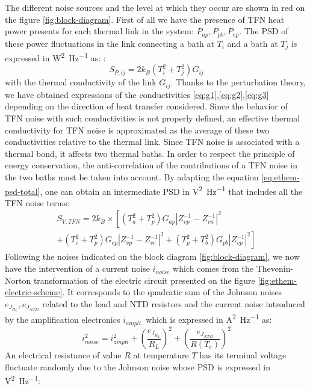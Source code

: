 The different noise sources and the level at which they occur are shown in red on the figure \ref{fig:block-diagram}. First of all we have the presence of TFN heat power presents for each thermal link in the system: $P_{ap}, P_{pb}, P_{ep}$. The PSD of these power fluctuations in the link connecting a bath at $T_i$ and a bath at $T_j$ is expressed in \si{\watt^2\per\Hz} as:
:
\begin{equation}
S_{P,ij} = 2k_B(T_i^2 + T_j^2) G_{ij}
\end{equation}
with the thermal conductivity of the link $G_{ij}$.
Thanks to the perturbation theory, we have obtained expressions of the conductivities \ref{eq:g1},\ref{eq:g2},\ref{eq:g3} depending on the direction of heat transfer considered. Since the behavior of TFN noise with such conductivities is not properly defined, an effective thermal conductivity for TFN noise is approximated as the average of these two conductivities relative to the thermal link. Since TFN noise is associated with a thermal bond, it affects two thermal baths. In order to respect the principle of energy conservation, the anti-correlation of the contributions of a TFN noise in the two baths must be taken into account. By adapting the equation \ref{eq:ethem-psd-total}, one can obtain an intermediate PSD in \si{\volt^2\per\Hz} that includes all the TFN noise terms:
\begin{multline}
S_{V,TFN} = 2k_B \times  \left[ (T_a^2 + T_p^2) G_{ap} \left\vert Z_{vp}^{-1} - Z_{va}^{-1} \right\vert^2 \right. \\ \left. + (T_e^2 + T_p^2) G_{ep} \left\vert Z_{vp}^{-1} - Z_{ve}^{-1} \right\vert^2 + (T_p^2 + T_b^2) G_{pb} \left\vert Z_{vp}^{-1}\right\vert^2 \right]
\end{multline}
Following the noises indicated on the block diagram \ref{fig:block-diagram}, we now have the intervention of a current noise $i_{noise}$ which comes from the Thevenin-Norton transformation of the electric circuit presented on the figure \ref{fig:ethem-electric-scheme}. It corresponds to the quadratic sum of the Johnson noises $e_{J_{R_L}}, e_{J_{NTD}}$ related to the load and NTD resistors and the current noise introduced by the amplification electronics $i_{ampli.}$ which is expressed in \si{\ampere^2\per\Hz} as: 
\begin{equation}
\label{i-bruit}
i_{noise}^2 = i_{ampli}^2 + \left( \frac{e_{J_{R_L}}}{R_L} \right)^2 + \left( \frac{e_{J_{NTD}}}{R(T_e)} \right)^2
\end{equation}
An electrical resistance of value $R$ at temperature $T$ has its terminal voltage fluctuate randomly due to the Johnson noise whose PSD is expressed in \si{\volt^2\per\Hz}:
